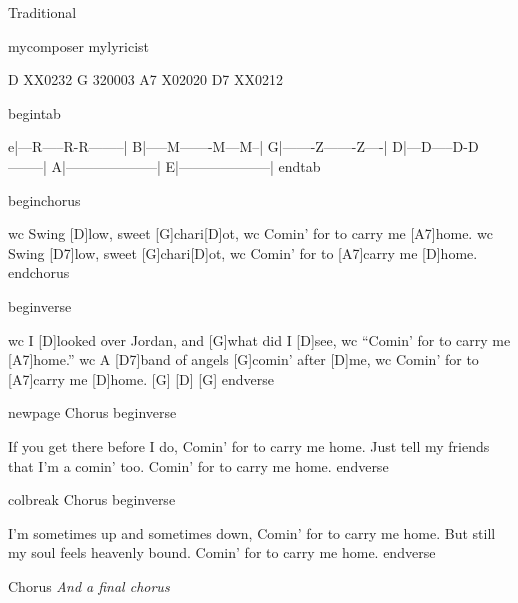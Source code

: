 
Traditional

mycomposer
mylyricist


D XX0232
G 320003
A7 X02020
D7 XX0212

begintab

e|---R-----R-R--------|
B|-----M-------M---M--|
G|-------Z-------Z----|
D|---D-----D-D--------|
A|--------------------|
E|--------------------|
endtab

beginchorus

wc Swing [D]low, sweet [G]chari[D]ot,
wc Comin{\textquoteright} for to carry me [A7]home.
wc Swing [D7]low, sweet [G]chari[D]ot,
wc Comin{\textquoteright} for to [A7]carry me [D]home.
endchorus

beginverse

wc I [D]looked over Jordan, and [G]what did I [D]see,
wc    {\textquotedblleft}Comin{\textquoteright} for to carry me [A7]home.{\textquotedblright}
wc A [D7]band of angels [G]comin{\textquoteright} after [D]me,
wc    Comin{\textquoteright} for to [A7]carry me [D]home.     [G]     [D]     [G]
endverse

newpage
Chorus
beginverse

If you get there before I do,
   Comin{\textquoteright} for to carry me home.
Just tell my friends that I{\textquoteright}m a comin{\textquoteright} too.
   Comin{\textquoteright} for to carry me home.
endverse

colbreak
Chorus
beginverse

I{\textquoteright}m sometimes up and sometimes down,
   Comin{\textquoteright} for to carry me home.
But still my soul feels heavenly bound.
   Comin{\textquoteright} for to carry me home.
endverse

Chorus
\textit{And a final chorus}

